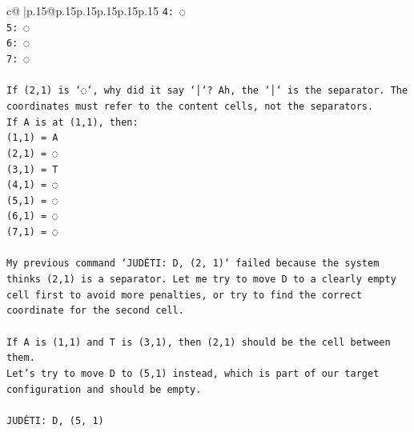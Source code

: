 \documentclass{article}
\begin{document}
{\begin{supertabular}{c@{$\;$}|p{.15\linewidth}@{}p{.15\linewidth}p{.15\linewidth}p{.15\linewidth}p{.15\linewidth}p{.15\linewidth}}
{{{\texttt{4: ◌} \\
\texttt{5: ◌} \\
\texttt{6: ◌} \\
\texttt{7: ◌} \\
\\ 
\texttt{If (2,1) is `◌`, why did it say `│`? Ah, the `│` is the separator. The coordinates must refer to the content cells, not the separators.} \\
\texttt{If A is at (1,1), then:} \\
\texttt{(1,1) = A} \\
\texttt{(2,1) = ◌} \\
\texttt{(3,1) = T} \\
\texttt{(4,1) = ◌} \\
\texttt{(5,1) = ◌} \\
\texttt{(6,1) = ◌} \\
\texttt{(7,1) = ◌} \\
\\ 
\texttt{My previous command `JUDĖTI: D, (2, 1)` failed because the system thinks (2,1) is a separator. Let me try to move D to a clearly empty cell first to avoid more penalties, or try to find the correct coordinate for the second cell.} \\
\\ 
\texttt{If A is (1,1) and T is (3,1), then (2,1) should be the cell between them.} \\
\texttt{Let's try to move D to (5,1) instead, which is part of our target configuration and should be empty.} \\
\\ 
\texttt{JUDĖTI: D, (5, 1)} \\
            }
        }
    }
     \\ \\


\end{supertabular}}
\end{document}
